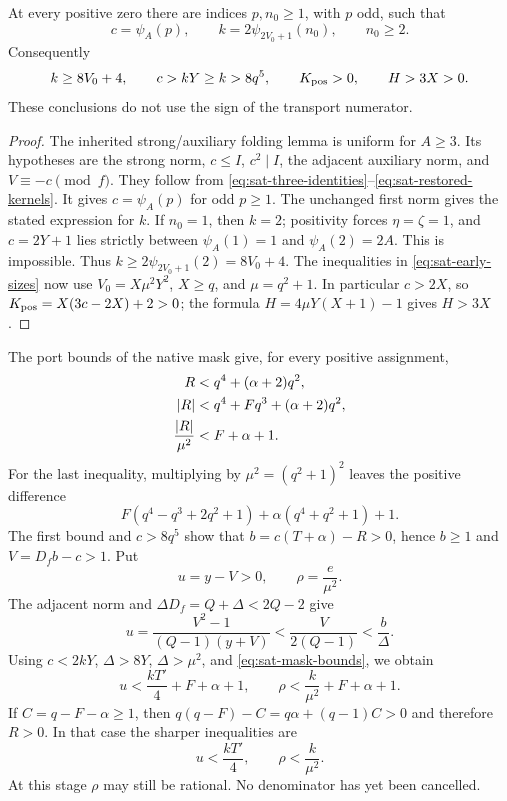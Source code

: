 \begin{lemma}
\label{lem:sat-early-fold}
At every positive zero there are indices $p,n_0\ge1$, with $p$ odd,
such that
\[
 c=\psi_A(p),\qquad
 k=2\psi_{2V_0+1}(n_0),\qquad n_0\ge2.
\]
Consequently
\begin{equation}
 k\ge8V_0+4,
 \qquad c>kY\ge k>8q^5,
 \qquad K_{\rm pos}>0,
 \qquad H>3X>0.
 \label{eq:sat-early-sizes}
\end{equation}
These conclusions do not use the sign of the transport numerator.
\end{lemma}

\begin{proof}
The inherited strong/auxiliary folding lemma is uniform for $A\ge3$.
Its hypotheses are the strong norm, $c\le I$, $c^2\mid I$, the
adjacent auxiliary norm, and $V\equiv-c\pmod f$.  They follow from
\eqref{eq:sat-three-identities}--\eqref{eq:sat-restored-kernels}.
It gives $c=\psi_A(p)$ for odd $p\ge1$.  The unchanged first norm
gives the stated expression for $k$.  If $n_0=1$, then $k=2$;
positivity forces $\eta=\zeta=1$, and $c=2Y+1$ lies strictly
between $\psi_A(1)=1$ and $\psi_A(2)=2A$.  This is impossible.
Thus $k\ge2\psi_{2V_0+1}(2)=8V_0+4$.
The inequalities in \eqref{eq:sat-early-sizes} now use
$V_0=X\mu^2Y^2$, $X\ge q$, and $\mu=q^2+1$.  In particular
$c>2X$, so $K_{\rm pos}=X(3c-2X)+2>0$; the formula
$H=4\mu Y(X+1)-1$ gives $H>3X$.
\end{proof}

The port bounds of the native mask give, for every positive assignment,
\begin{align}
 R&<q^4+(\alpha+2)q^2,\notag\\
 |R|&<q^4+Fq^3+(\alpha+2)q^2,\notag\\
 \frac{|R|}{\mu^2}&<F+\alpha+1.
 \label{eq:sat-mask-bounds}
\end{align}
For the last inequality, multiplying by $\mu^2=(q^2+1)^2$ leaves
the positive difference
\[
 F(q^4-q^3+2q^2+1)+\alpha(q^4+q^2+1)+1.
\]
The first bound and $c>8q^5$ show that
$b=c(T+\alpha)-R>0$, hence $b\ge1$ and $V=D_fb-c>1$.
Put
\[
 u=y-V>0,\qquad \rho=\frac{e}{\mu^2}.
\]
The adjacent norm and $\Delta D_f=Q+\Delta<2Q-2$ give
\[
 u=\frac{V^2-1}{(Q-1)(y+V)}
   <\frac{V}{2(Q-1)}<\frac b\Delta.
\]
Using $c<2kY$, $\Delta>8Y$, $\Delta>\mu^2$, and
\eqref{eq:sat-mask-bounds}, we obtain
\begin{equation}
 u<\frac{kT'}4+F+\alpha+1,
 \qquad \rho<\frac{k}{\mu^2}+F+\alpha+1.
 \label{eq:sat-general-u-rho}
\end{equation}
If $C=q-F-\alpha\ge1$, then
$q(q-F)-C=q\alpha+(q-1)C>0$ and therefore $R>0$.
In that case the sharper inequalities are
\begin{equation}
 u<\frac{kT'}4,
 \qquad \rho<\frac{k}{\mu^2}.
 \label{eq:sat-sharp-u-rho}
\end{equation}
At this stage $\rho$ may still be rational.  No denominator has yet
been cancelled.

